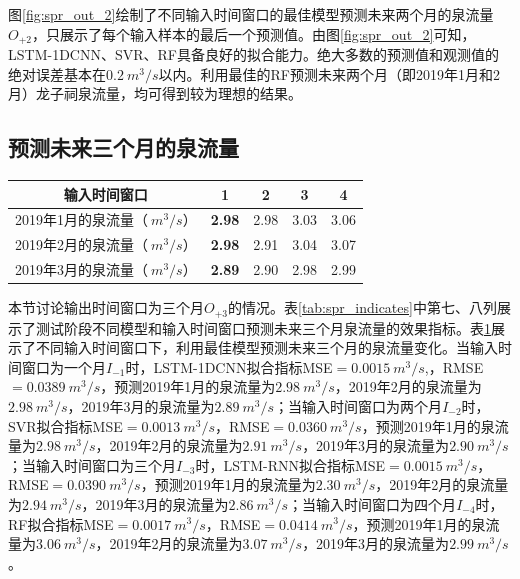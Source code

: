图\ref{fig:spr_out_2}绘制了不同输入时间窗口的最佳模型预测未来两个月的泉流量$O_{+2}$，只展示了每个输入样本的最后一个预测值。由图\ref{fig:spr_out_2}可知，    LSTM-1DCNN、SVR、RF具备良好的拟合能力。绝大多数的预测值和观测值的绝对误差基本在$\SI{0.2}{m^{3}/s}$以内。利用最佳的RF预测未来两个月（即2019年1月和2月）龙子祠泉流量，均可得到较为理想的结果。

\subsection{预测未来三个月的泉流量}\label{sec:spr_three}

\begin{table}[!htbp]
  \centering
  \label{tab:spr_three}
  \footnotesize
  \begin{tabular}{ccccc}
    \toprule
    输入时间窗口 & 1 & 2 & 3 & 4 \\
    \midrule
    2019年1月的泉流量（$\SI{}{m^{3}/s}$）& \textbf{2.98} & 2.98 & 3.03 & 3.06  \\
    2019年2月的泉流量（$\SI{}{m^{3}/s}$）& \textbf{2.98} & 2.91 & 3.04 & 3.07  \\
    2019年3月的泉流量（$\SI{}{m^{3}/s}$）& \textbf{2.89} & 2.90 & 2.98 & 2.99  \\
    \bottomrule
  \end{tabular}
\end{table}

本节讨论输出时间窗口为三个月$O_{+3}$的情况。表\ref{tab:spr_indicates}中第七、八列展示了测试阶段不同模型和输入时间窗口预测未来三个月泉流量的效果指标。表\ref{tab:spr_three}展示了不同输入时间窗口下，利用最佳模型预测未来三个月的泉流量变化。当输入时间窗口为一个月$I_{-1}$时，LSTM-1DCNN拟合指标MSE$=\SI{0.0015}{m^{3}/s}$,，RMSE$=\SI{0.0389}{m^{3}/s}$，预测2019年1月的泉流量为$\SI{2.98}{m^{3}/s}$，2019年2月的泉流量为$\SI{2.98}{m^{3}/s}$，2019年3月的泉流量为$\SI{2.89}{m^{3}/s}$；当输入时间窗口为两个月$I_{-2}$时，SVR拟合指标MSE$=\SI{0.0013}{m^{3}/s}$，RMSE$=\SI{0.0360}{m^{3}/s}$，预测2019年1月的泉流量为$\SI{2.98}{m^{3}/s}$，2019年2月的泉流量为$\SI{2.91}{m^{3}/s}$，2019年3月的泉流量为$\SI{2.90}{m^{3}/s}$；当输入时间窗口为三个月$I_{-3}$时，LSTM-RNN拟合指标MSE$=\SI{0.0015}{m^{3}/s}$，RMSE$=\SI{0.0390}{m^{3}/s}$，预测2019年1月的泉流量为$\SI{2.30}{m^{3}/s}$，2019年2月的泉流量为$\SI{2.94}{m^{3}/s}$，2019年3月的泉流量为$\SI{2.86}{m^{3}/s}$；当输入时间窗口为四个月$I_{-4}$时，RF拟合指标MSE$=\SI{0.0017}{m^{3}/s}$，RMSE$=\SI{0.0414}{m^{3}/s}$，预测2019年1月的泉流量为$\SI{3.06}{m^{3}/s}$，2019年2月的泉流量为$\SI{3.07}{m^{3}/s}$，2019年3月的泉流量为$\SI{2.99}{m^{3}/s}$。

